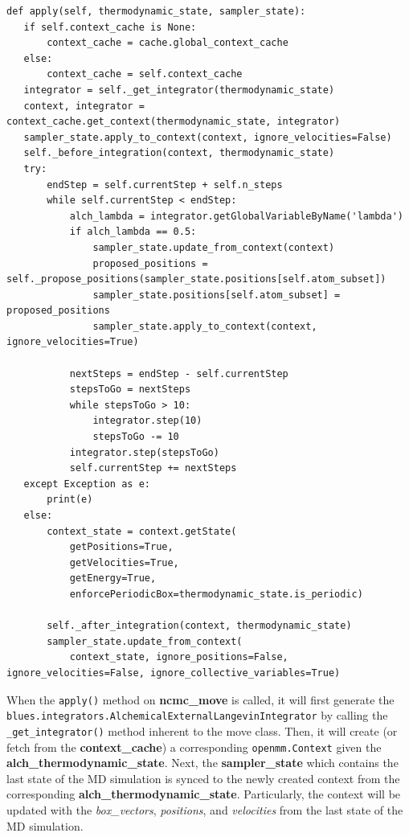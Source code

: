 \begin{verbatim}
def apply(self, thermodynamic_state, sampler_state):
   if self.context_cache is None:
       context_cache = cache.global_context_cache
   else:
       context_cache = self.context_cache
   integrator = self._get_integrator(thermodynamic_state)
   context, integrator = context_cache.get_context(thermodynamic_state, integrator)
   sampler_state.apply_to_context(context, ignore_velocities=False)
   self._before_integration(context, thermodynamic_state)
   try:
       endStep = self.currentStep + self.n_steps
       while self.currentStep < endStep:
           alch_lambda = integrator.getGlobalVariableByName('lambda')
           if alch_lambda == 0.5:
               sampler_state.update_from_context(context)
               proposed_positions = self._propose_positions(sampler_state.positions[self.atom_subset])
               sampler_state.positions[self.atom_subset] = proposed_positions
               sampler_state.apply_to_context(context, ignore_velocities=True)

           nextSteps = endStep - self.currentStep
           stepsToGo = nextSteps
           while stepsToGo > 10:
               integrator.step(10)
               stepsToGo -= 10
           integrator.step(stepsToGo)
           self.currentStep += nextSteps
   except Exception as e:
       print(e)
   else:
       context_state = context.getState(
           getPositions=True,
           getVelocities=True,
           getEnergy=True,
           enforcePeriodicBox=thermodynamic_state.is_periodic)

       self._after_integration(context, thermodynamic_state)
       sampler_state.update_from_context(
           context_state, ignore_positions=False, ignore_velocities=False, ignore_collective_variables=True)
\end{verbatim}

When the \texttt{apply()} method on \textbf{ncmc\_move} is called, it will first generate the \texttt{blues.integrators.AlchemicalExternalLangevinIntegrator} by calling the \texttt{_get_integrator()} method inherent to the move class. 
Then, it will create (or fetch from the \textbf{context\_cache}) a corresponding \texttt{openmm.Context} given the \textbf{alch\_thermodynamic\_state}.
Next, the \textbf{sampler\_state} which contains the last state of the MD simulation is synced to the
newly created context from the corresponding \textbf{alch\_thermodynamic\_state}.
Particularly, the context will be updated with the \emph{box\_vectors}, \emph{positions}, and
\emph{velocities} from the last state of the MD simulation.

